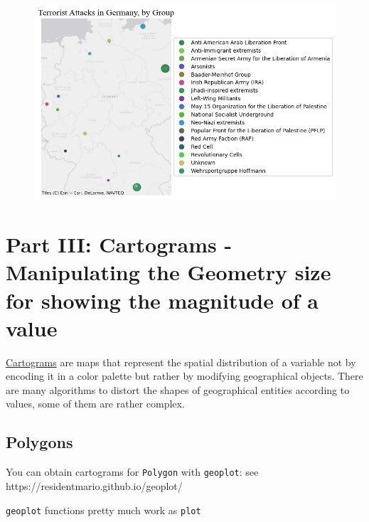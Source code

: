 \documentclass[
  letterpaper,
  DIV=11,
  numbers=noendperiod]{scrreprt}
\begin{document}
\begin{figure}[H]

{\centering \includegraphics{labs/w02_maps_files/figure-pdf/cell-48-output-1.png}

}

\end{figure}

\hypertarget{part-iii-cartograms---manipulating-the-geometry-size-for-showing-the-magnitude-of-a-value}{%
\section{Part III: Cartograms - Manipulating the Geometry size for
showing the magnitude of a
value}\label{part-iii-cartograms---manipulating-the-geometry-size-for-showing-the-magnitude-of-a-value}}

\href{https://www.data-to-viz.com/graph/cartogram.html}{Cartograms} are
maps that represent the spatial distribution of a variable not by
encoding it in a color palette but rather by modifying geographical
objects. There are many algorithms to distort the shapes of geographical
entities according to values, some of them are rather complex.

\hypertarget{polygons}{%
\subsection{Polygons}\label{polygons}}

You can obtain cartograms for \texttt{Polygon} with \texttt{geoplot}:
see https://residentmario.github.io/geoplot/

\texttt{geoplot} functions pretty much work as \texttt{plot}
\end{document}
